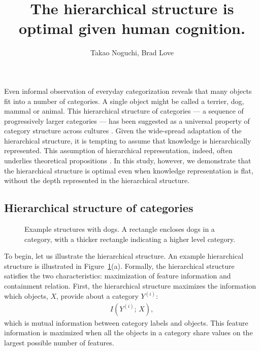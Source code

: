 \documentclass[doc]{apa6}
\title{The hierarchical structure is optimal given human cognition.}
\author{Takao Noguchi, Brad Love}
\affiliation{Department of Experimental Psychology, University College London}
\begin{document}
\maketitle

Even informal observation of everyday categorization reveals that many objects fit into a number of
categories. A single object might be called a terrier, dog, mammal or animal. This hierarchical
structure of categories --- a sequence of progressively larger categories --- has been suggested as
a universal property of category structure across cultures \parencite{Berlin1992a, Atran1998a}.
Given the wide-spread adaptation of the hierarchical structure, it is tempting to assume that
knowledge is hierarchically represented. This assumption of hierarchical representation, indeed,
often underlies theoretical propositions \parencite[e.g.,][]{Tenenbaum2011a}. In this study,
however, we demonstrate that the hierarchical structure is optimal even when knowledge
representation is flat, without the depth represented in the hierarchical structure.


\subsection*{Hierarchical structure of categories}

\begin{figure}
    \centering



    \vspace{10pt}

    \caption{Example structures with dogs. A rectangle encloses dogs in a category, with a thicker
    rectangle indicating a higher level category.}

\label{fig:example}
\end{figure}

To begin, let us illustrate the hierarchical structure.  An example hierarchical structure is
illustrated in Figure~\ref{fig:example}(a). Formally, the hierarchical structure satisfies the two
characteristics: maximization of feature information and containment relation.  First, the
hierarchical structure maximizes the information which objects, $X$, provide about a category
$Y^{(i)}$:
\begin{align}
    I \left( Y^{(i)};\, X \right),
\label{eqn:feature}
\end{align}
which is mutual information between category labels and objects. This feature information is
maximized when all the objects in a category share values on the largest possible number of
features.
\end{document}
